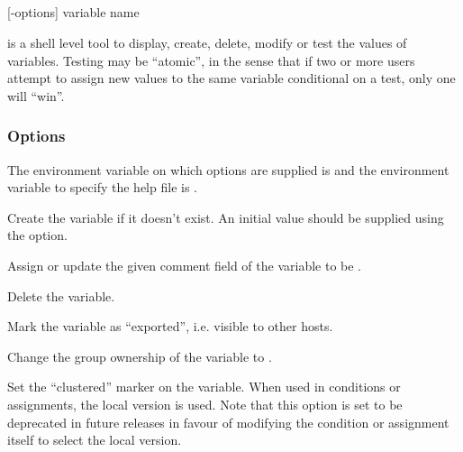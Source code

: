 \subsection{\BtvarName}

\begin{expara}

\BtvarName{} [-options] variable name

\end{expara}

\PrBtvar{} is a shell level tool to display, create, delete, modify or test the values of \ProductName{}
variables. Testing may be ``atomic'', in the sense that if two or more users attempt to assign new values to the
same variable conditional on a test, only one will ``win''.

\subsubsection{Options}
The environment variable on which options are supplied is \filename{\BtvarVarname} and the
environment variable to specify the help file is .

\explainopt


Create the variable if it doesn't exist. An initial value should be supplied using the  option.


Assign or update the given comment field of the variable to be .


Delete the variable.


Mark the variable as ``exported'', i.e. visible to other hosts.


Change the group ownership of the variable to .


Set the ``clustered'' marker on the variable. When used in conditions or assignments, the local version is used. Note that this
option is set to be deprecated in future releases in favour of modifying the condition or assignment itself to select the local version.


